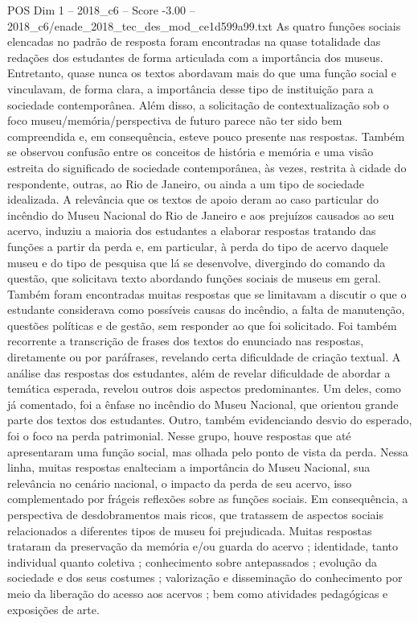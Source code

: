 \begin{textsample}{POS Dim 1 – 2018\_c6 – Score -3.00 – 2018\_c6/enade\_2018\_tec\_des\_mod\_ce1d599a99.txt}
As quatro funções sociais elencadas no padrão de resposta foram encontradas na quase totalidade das redações dos estudantes de forma articulada com a importância dos museus.
Entretanto, quase nunca os textos abordavam mais do que uma função social e vinculavam, de forma clara, a importância desse tipo de instituição para a sociedade contemporânea.
Além disso, a solicitação de contextualização sob o foco museu/memória/perspectiva de futuro parece não ter sido bem compreendida e, em consequência, esteve pouco presente nas respostas.
Também se observou confusão entre os conceitos de história e memória e uma visão estreita do significado de sociedade contemporânea, às vezes, restrita à cidade do respondente, outras, ao Rio de Janeiro, ou ainda a um tipo de sociedade idealizada.
A relevância que os textos de apoio deram ao caso particular do incêndio do Museu Nacional do Rio de Janeiro e aos prejuízos causados ao seu acervo, induziu a maioria dos estudantes a elaborar respostas tratando das funções a partir da perda e, em particular, à perda do tipo de acervo daquele museu e do tipo de pesquisa que lá se desenvolve, divergindo do comando da questão, que solicitava texto abordando funções sociais de museus em geral.
Também foram encontradas muitas respostas que se limitavam a discutir o que o estudante considerava como possíveis causas do incêndio, a falta de manutenção, questões políticas e de gestão, sem responder ao que foi solicitado.
Foi também recorrente a transcrição de frases dos textos do enunciado nas respostas, diretamente ou por paráfrases, revelando certa dificuldade de criação textual.
A análise das respostas dos estudantes, além de revelar dificuldade de abordar a temática esperada, revelou outros dois aspectos predominantes.
Um deles, como já comentado, foi a ênfase no incêndio do Museu Nacional, que orientou grande parte dos textos dos estudantes.
Outro, também evidenciando desvio do esperado, foi o foco na perda patrimonial.
Nesse grupo, houve respostas que até apresentaram uma função social, mas olhada pelo ponto de vista da perda.
Nessa linha, muitas respostas enalteciam a importância do Museu Nacional, sua relevância no cenário nacional, o impacto da perda de seu acervo, isso complementado por frágeis reflexões sobre as funções sociais.
Em consequência, a perspectiva de desdobramentos mais ricos, que tratassem de aspectos sociais relacionados a diferentes tipos de museu foi prejudicada.
Muitas respostas trataram da preservação da memória e/ou guarda do acervo ; identidade, tanto individual quanto coletiva ; conhecimento sobre antepassados ; evolução da sociedade e dos seus costumes ; valorização e disseminação do conhecimento por meio da liberação do acesso aos acervos ; bem como atividades pedagógicas e exposições de arte.

\end{textsample}
